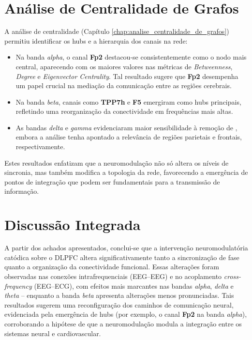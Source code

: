 \section{Análise de Centralidade de Grafos}
A análise de centralidade (Capítulo \ref{chap:analise_centralidade_de_grafos}) permitiu identificar os hubs e a hierarquia dos canais na rede:
\begin{itemize}
    \item Na banda \emph{alpha}, o canal \textbf{Fp2} destacou-se consistentemente como o nodo mais central, aparecendo com os maiores valores nas métricas de \textit{Betweenness}, \textit{Degree} e \textit{Eigenvector Centrality}. Tal resultado sugere que \textbf{Fp2} desempenha um papel crucial na mediação da comunicação entre as regiões cerebrais.
    \item Na banda \emph{beta}, canais como \textbf{TPP7h} e \textbf{F5} emergiram como hubs principais, refletindo uma reorganização da conectividade em frequências mais altas.
    \item As bandas \emph{delta} e \emph{gamma} evidenciaram maior sensibilidade à remoção de , embora a análise tenha apontado a relevância de regiões parietais e frontais, respectivamente.
\end{itemize}
Estes resultados enfatizam que a neuromodulação não só altera os níveis de sincronia, mas também modifica a topologia da rede, favorecendo a emergência de pontos de integração que podem ser fundamentais para a transmissão de informação.

\section{Discussão Integrada}
A partir dos achados apresentados, conclui-se que a intervenção neuromodulatória catódica sobre o DLPFC altera significativamente tanto a sincronização de fase quanto a organização da conectividade funcional. Essas alterações foram observadas nas conexões intrafrequenciais (EEG--EEG) e no acoplamento \textit{cross-frequency} (EEG--ECG), com efeitos mais marcantes nas bandas \emph{alpha}, \emph{delta} e \emph{theta} – enquanto a banda \emph{beta} apresenta alterações menos pronunciadas. Tais resultados sugerem uma reconfiguração dos caminhos de comunicação neural, evidenciada pela emergência de hubs (por exemplo, o canal \textbf{Fp2} na banda \emph{alpha}), corroborando a hipótese de que a neuromodulação modula a integração entre os sistemas neural e cardiovascular.


